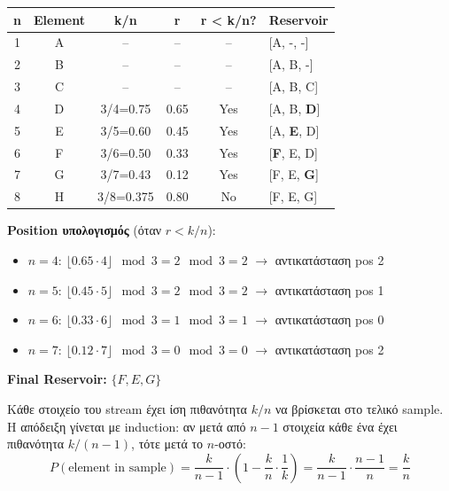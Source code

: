 \begin{center}
\begin{tabular}{cccccl}
\toprule
\textbf{n} & \textbf{Element} & \textbf{k/n} & \textbf{r} & \textbf{r < k/n?} & \textbf{Reservoir} \\
\midrule
1 & A & -- & -- & -- & [A, -, -] \\
2 & B & -- & -- & -- & [A, B, -] \\
3 & C & -- & -- & -- & [A, B, C] \\
4 & D & 3/4=0.75 & 0.65 & Yes & [A, B, \textbf{D}] \\
5 & E & 3/5=0.60 & 0.45 & Yes & [A, \textbf{E}, D] \\
6 & F & 3/6=0.50 & 0.33 & Yes & [\textbf{F}, E, D] \\
7 & G & 3/7=0.43 & 0.12 & Yes & [F, E, \textbf{G}] \\
8 & H & 3/8=0.375 & 0.80 & No & [F, E, G] \\
\bottomrule
\end{tabular}
\end{center}

\textbf{Position υπολογισμός} (όταν $r < k/n$):
\begin{itemize}
    \item $n=4$: $\lfloor 0.65 \cdot 4 \rfloor \mod 3 = 2 \mod 3 = 2$ $\to$ αντικατάσταση pos 2
    \item $n=5$: $\lfloor 0.45 \cdot 5 \rfloor \mod 3 = 2 \mod 3 = 2$ $\to$ αντικατάσταση pos 1
    \item $n=6$: $\lfloor 0.33 \cdot 6 \rfloor \mod 3 = 1 \mod 3 = 1$ $\to$ αντικατάσταση pos 0
    \item $n=7$: $\lfloor 0.12 \cdot 7 \rfloor \mod 3 = 0 \mod 3 = 0$ $\to$ αντικατάσταση pos 2
\end{itemize}

\textbf{Final Reservoir:} $\{F, E, G\}$

\begin{infobox}
Κάθε στοιχείο του stream έχει ίση πιθανότητα $k/n$ να βρίσκεται στο τελικό sample.
Η απόδειξη γίνεται με induction: αν μετά από $n-1$ στοιχεία κάθε ένα έχει
πιθανότητα $k/(n-1)$, τότε μετά το $n$-οστό:
$$P(\text{element in sample}) = \frac{k}{n-1} \cdot \left(1 - \frac{k}{n} \cdot \frac{1}{k}\right) = \frac{k}{n-1} \cdot \frac{n-1}{n} = \frac{k}{n}$$
\end{infobox}

